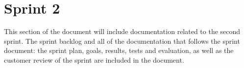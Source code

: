 \documentclass[../document.tex]{subfiles}
\begin{document}
\section{Sprint 2}

This section of the document will include documentation related to the second sprint. The sprint backlog and all of the documentation that follows the sprint document: the sprint plan, goals, results, tests and evaluation, as well as the customer review of the sprint are included in the document.
\end{document}
